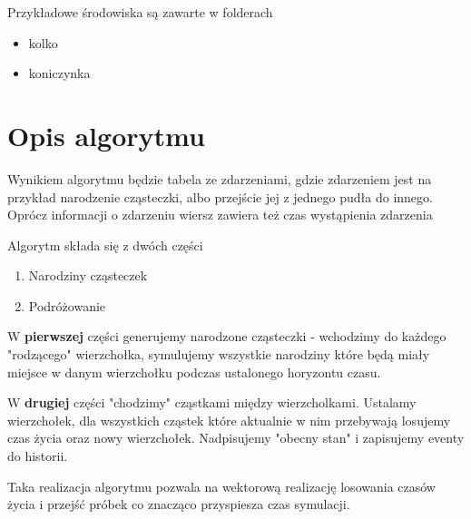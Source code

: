 \documentclass{article}
\begin{document}
Przykładowe środowiska są zawarte w folderach \begin{itemize}
\item kolko
\item koniczynka
\end{itemize}

\section{Opis algorytmu}

Wynikiem algorytmu będzie tabela ze zdarzeniami, gdzie zdarzeniem jest na przykład narodzenie cząsteczki, albo przejście jej z jednego pudła do innego. Oprócz informacji o zdarzeniu wiersz zawiera też czas wystąpienia zdarzenia

Algorytm składa się z dwóch części \begin{enumerate}
\item Narodziny cząsteczek
\item Podróżowanie
\end{enumerate}


W \textbf{pierwszej} części generujemy narodzone cząsteczki - wchodzimy do każdego "rodzącego" wierzchołka, symulujemy wszystkie narodziny które będą miały miejsce w danym wierzchołku podczas ustalonego horyzontu czasu.

W \textbf{drugiej} części "chodzimy" cząstkami między wierzcholkami. Ustalamy wierzchołek, dla wszystkich cząstek które aktualnie w nim przebywają losujemy czas życia oraz nowy wierzchołek. Nadpisujemy "obecny stan" i zapisujemy eventy do historii.

Taka realizacja algorytmu pozwala na wektorową realizację losowania czasów życia i przejść próbek co znacząco przyspiesza czas symulacji.
\end{document}
